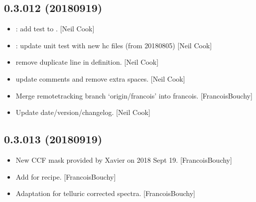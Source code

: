 \documentclass[a4paper,10pt,english]{report}
\begin{document}
\subsection{0.3.012 (2018\sphinxhyphen{}09\sphinxhyphen{}19)}
\label{\detokenize{misc/changelog:id337}}\begin{itemize}
\item {} 
: add  test to . {[}Neil Cook{]}

\item {} 
: update unit test with new hc files (from 2018\sphinxhyphen{}08\sphinxhyphen{}05) {[}Neil
Cook{]}

\item {} 
 \sphinxhyphen{} remove duplicate line in  definition.
{[}Neil Cook{]}

\item {} 
 \sphinxhyphen{} update comments and remove extra spaces.
{[}Neil Cook{]}

\item {} 
Merge remote\sphinxhyphen{}tracking branch ‘origin/francois’ into francois.
{[}FrancoisBouchy{]}

\item {} 
Update date/version/changelog. {[}Neil Cook{]}

\end{itemize}


\subsection{0.3.013 (2018\sphinxhyphen{}09\sphinxhyphen{}19)}
\label{\detokenize{misc/changelog:id338}}\begin{itemize}
\item {} 
New CCF mask provided by Xavier on 2018 Sept 19. {[}FrancoisBouchy{]}

\item {} 
Add  for  recipe. {[}FrancoisBouchy{]}

\item {} 
Adaptation for telluric corrected spectra. {[}FrancoisBouchy{]}

\end{itemize}
\end{document}
